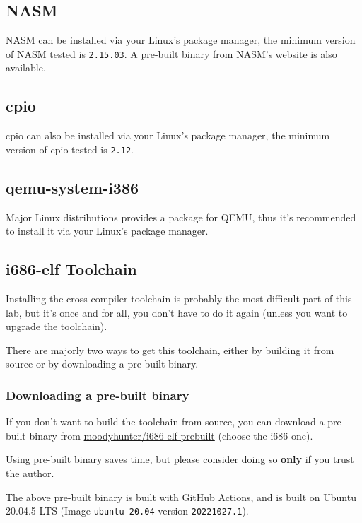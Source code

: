 \subsection{NASM} \label{sec:nasm-install}

NASM can be installed via your Linux's package manager, the minimum version of NASM tested is
\texttt{2.15.03}. A pre-built binary from \href{https://www.nasm.us}{NASM's website} is also
available.

\subsection{cpio} \label{sec:cpio-install}

cpio can also be installed via your Linux's package manager, the minimum version of cpio
tested is \texttt{2.12}.

\subsection{qemu-system-i386} \label{sec:qemu-install}

Major Linux distributions provides a package for QEMU, thus it's recommended to install it via
your Linux's package manager.

\subsection{i686-elf Toolchain} \label{sec:cross-compiler-install}

Installing the cross-compiler toolchain is probably the most difficult part of this lab,
but it's once and for all, you don't have to do it again (unless you want to upgrade the
toolchain).

There are majorly two ways to get this toolchain, either by building it from source or by
downloading a pre-built binary.

\subsubsection{Downloading a pre-built binary}

If you don't want to build the toolchain from source, you can download a pre-built
binary from
\href{https://github.com/moodyhunter/i686-elf-prebuilt/releases}{moodyhunter/i686-elf-prebuilt}
(choose the i686 one).

\begin{warning}
    \item Using pre-built binary saves time, but please consider doing so \textbf{only} if
    you trust the author.
    \item The above pre-built binary is built with GitHub Actions, and is built on Ubuntu 20.04.5
    LTS (Image \texttt{ubuntu-20.04} version \texttt{20221027.1}).
\end{warning}

